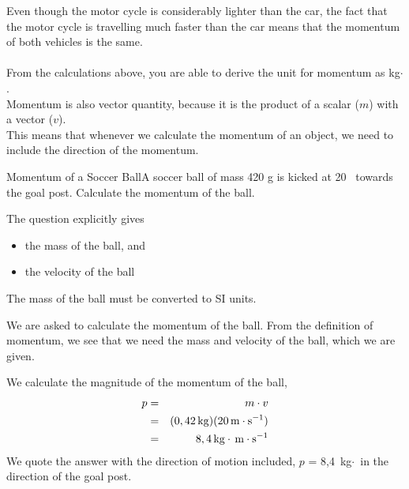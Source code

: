 Even though the motor cycle is considerably lighter than the car, the fact that the motor cycle is travelling much faster than the car means that the momentum of both vehicles is the same.\\
\\
From the calculations above, you are able to derive the unit for momentum as kg$\cdot$\ms.\\
Momentum is also vector quantity, because it is the product of a scalar ($m$) with a vector ($v$).\\This means that whenever we calculate the momentum of an object, we need to include the direction of the momentum.
\begin{wex}{Momentum of a Soccer Ball}{A soccer ball of mass 420 g is kicked at 20 \ms\ towards the goal post. Calculate the momentum of the ball.}{
The question explicitly gives
\begin{itemize}
\item the mass of the ball, and
\item the velocity of the ball
\end{itemize}
The mass of the ball must be converted to SI units.


We are asked to calculate the momentum of the ball. From the definition of momentum,
we see that we need the mass and velocity of the ball, which we are given.

We calculate the magnitude of the momentum of the ball,
\begin{eqnarray*}
p&=& m \cdot v \\
&=& (0,42 \,\mathrm{kg})(20 \,\mathrm{m \cdot s^{-1}})\\
&=& 8,4\,\mathrm{kg} \cdot \,\mathrm{m \cdot s^{-1}}
\end{eqnarray*}
We quote the answer with the direction of motion included,
$p$ = 8,4~kg$\cdot$\ms\ in the direction of the goal post.}
\end{wex}


